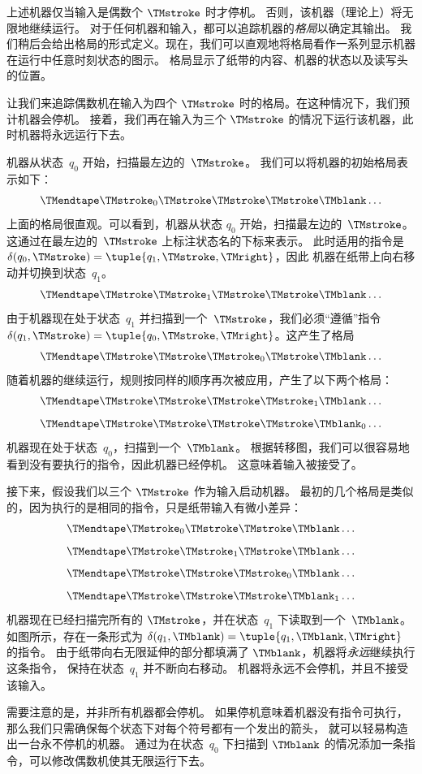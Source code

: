 \documentclass[../../../include/open-logic-section]{subfiles}
\begin{document}
\begin{explain}
上述机器仅当输入是偶数个 $\TMstroke$ 时才停机。
否则，该机器（理论上）将无限地继续运行。
对于任何机器和输入，都可以追踪机器的\emph{格局}以确定其输出。
我们稍后会给出格局的形式定义。现在，我们可以直观地将格局看作一系列显示机器在运行中任意时刻状态的图示。
格局显示了纸带的内容、机器的状态以及读写头的位置。

让我们来追踪偶数机在输入为四个 $\TMstroke$ 时的格局。在这种情况下，我们预计机器会停机。
接着，我们再在输入为三个 $\TMstroke$ 的情况下运行该机器，此时机器将永远运行下去。

机器从状态~$q_0$ 开始，扫描最左边的~$\TMstroke$。
我们可以将机器的初始格局表示如下：
\[
\TMendtape \TMstroke_0 \TMstroke \TMstroke \TMstroke \TMblank \ldots
\]
上面的格局很直观。可以看到，机器从状态 $q_0$ 开始，扫描最左边的~$\TMstroke$。
这通过在最左边的~$\TMstroke$ 上标注状态名的下标来表示。
此时适用的指令是
$\delta(q_0, \TMstroke) = \tuple{q_1, \TMstroke, \TMright}$，因此
机器在纸带上向右移动并切换到状态~$q_1$。
\[
\TMendtape \TMstroke \TMstroke_1 \TMstroke \TMstroke \TMblank \ldots
\]
由于机器现在处于状态~$q_1$ 并扫描到一个~$\TMstroke$，我们必须“遵循”指令
$\delta(q_1, \TMstroke) = \tuple{q_0,
  \TMstroke, \TMright}$。这产生了格局
\[
\TMendtape \TMstroke \TMstroke \TMstroke_0 \TMstroke \TMblank \ldots
\]
随着机器的继续运行，规则按同样的顺序再次被应用，产生了以下两个格局：
\[
\TMendtape \TMstroke \TMstroke \TMstroke \TMstroke_1 \TMblank \ldots
\]
\[
\TMendtape \TMstroke \TMstroke \TMstroke \TMstroke \TMblank_0 \ldots
\]
机器现在处于状态~$q_0$，扫描到一个~$\TMblank$。
根据转移图，我们可以很容易地看到没有要执行的指令，因此机器已经停机。
这意味着输入被接受了。

接下来，假设我们以三个 $\TMstroke$ 作为输入启动机器。
最初的几个格局是类似的，因为执行的是相同的指令，只是纸带输入有微小差异：
\[
\TMendtape \TMstroke_0 \TMstroke \TMstroke \TMblank \ldots
\]
\[
\TMendtape \TMstroke \TMstroke_1 \TMstroke \TMblank \ldots
\]
\[
\TMendtape \TMstroke \TMstroke \TMstroke_0 \TMblank \ldots
\]
\[
\TMendtape \TMstroke \TMstroke \TMstroke \TMblank_1 \ldots
\]
机器现在已经扫描完所有的 $\TMstroke$，并在状态~$q_1$ 下读取到一个~$\TMblank$。
如图所示，存在一条形式为
$\delta(q_1, \TMblank) =\tuple{q_1,
\TMblank, \TMright}$ 的指令。
由于纸带向右无限延伸的部分都填满了 $\TMblank$，机器将\emph{永远}继续执行这条指令，
保持在状态~$q_1$ 并不断向右移动。
机器将永远不会停机，并且不接受该输入。
\end{explain}

\begin{explain}
需要注意的是，并非所有机器都会停机。
如果停机意味着机器没有指令可执行，那么我们只需确保每个状态下对每个符号都有一个发出的箭头，
就可以轻易构造出一台永不停机的机器。
通过为在状态~$q_0$ 下扫描到 $\TMblank$ 的情况添加一条指令，可以修改偶数机使其无限运行下去。
\end{explain}
\end{document}
